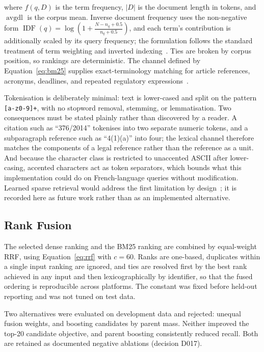 where $f(q,D)$ is the term frequency, $|D|$ is the document length in tokens, and $\operatorname{avgdl}$ is the corpus mean. Inverse document frequency uses the non-negative form $\operatorname{IDF}(q) = \log\!\left(1 + \frac{N - n_q + 0.5}{n_q + 0.5}\right)$, and each term's contribution is additionally scaled by its query frequency; the formulation follows the standard treatment of term weighting and inverted indexing~\cite{manning2008ir}. Ties are broken by corpus position, so rankings are deterministic. The channel defined by Equation~\ref{eq:bm25} supplies exact-terminology matching for article references, acronyms, deadlines, and repeated regulatory expressions~\cite{robertson2009bm25}.

Tokenisation is deliberately minimal: text is lower-cased and split on the pattern \texttt{[a-z0-9]+}, with no stopword removal, stemming, or lemmatisation. Two consequences must be stated plainly rather than discovered by a reader. A citation such as ``376/2014'' tokenises into two separate numeric tokens, and a subparagraph reference such as ``4(1)(a)'' into four; the lexical channel therefore matches the components of a legal reference rather than the reference as a unit. And because the character class is restricted to unaccented ASCII after lower-casing, accented characters act as token separators, which bounds what this implementation could do on French-language queries without modification. Learned sparse retrieval would address the first limitation by design~\cite{formal2021splade}; it is recorded here as future work rather than as an implemented alternative.

\subsection{Rank Fusion}

The selected dense ranking and the BM25 ranking are combined by equal-weight \ac{RRF}, using Equation~\ref{eq:rrf} with $c = 60$. Ranks are one-based, duplicates within a single input ranking are ignored, and ties are resolved first by the best rank achieved in any input and then lexicographically by identifier, so that the fused ordering is reproducible across platforms. The constant was fixed before held-out reporting and was not tuned on test data.

Two alternatives were evaluated on development data and rejected: unequal fusion weights, and boosting candidates by parent mass. Neither improved the top-20 candidate objective, and parent boosting consistently reduced recall. Both are retained as documented negative ablations (decision D017).

